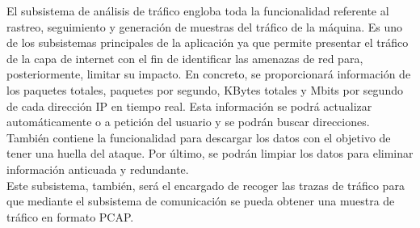 El subsistema de análisis de tráfico engloba toda la funcionalidad referente al rastreo, seguimiento y generación de muestras del tráfico de la máquina. Es uno de los subsistemas principales de la aplicación ya que permite presentar el tráfico de la capa de internet con el fin de identificar las amenazas de red para, posteriormente, limitar su impacto.
En concreto, se proporcionará información de los paquetes totales, paquetes por segundo, KBytes totales y Mbits por segundo de cada dirección IP en tiempo real. Esta información se podrá actualizar automáticamente o a petición del usuario y se podrán buscar direcciones.
También contiene la funcionalidad para descargar los datos con el objetivo de tener una huella del ataque. Por último, se podrán limpiar los datos para eliminar información anticuada y redundante.
\\Este subsistema, también, será el encargado de recoger las trazas de tráfico para que mediante el subsistema de comunicación se pueda obtener una muestra de tráfico en formato PCAP.
